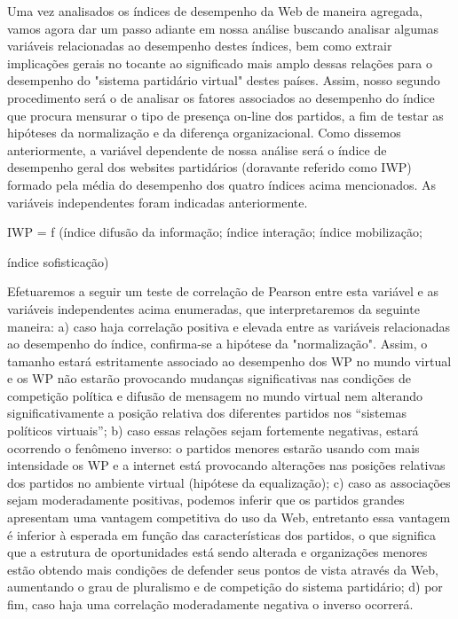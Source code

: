Uma vez analisados os índices de desempenho da Web de maneira agregada,
vamos agora dar um passo adiante em nossa análise buscando analisar
algumas variáveis relacionadas ao desempenho destes índices, bem como
extrair implicações gerais no tocante ao significado mais amplo dessas
relações para o desempenho do "sistema partidário virtual" destes
países. Assim, nosso segundo procedimento será o de analisar os fatores
associados ao desempenho do índice que procura mensurar o tipo de
presença on-line dos partidos, a fim de testar as hipóteses da
normalização e da diferença organizacional. Como dissemos anteriormente,
a variável dependente de nossa análise será o índice de desempenho geral
dos websites partidários (doravante referido como IWP) formado pela
média do desempenho dos quatro índices acima mencionados. As variáveis
independentes foram indicadas anteriormente.

IWP = f (índice difusão da informação; índice interação; índice
mobilização;

índice sofisticação)

Efetuaremos a seguir um teste de correlação de Pearson entre esta
variável e as variáveis independentes acima enumeradas, que
interpretaremos da seguinte maneira: a) caso haja correlação positiva e
elevada entre as variáveis relacionadas ao desempenho do índice,
confirma-se a hipótese da "normalização". Assim, o tamanho estará
estritamente associado ao desempenho dos WP no mundo virtual e os WP não
estarão provocando mudanças significativas nas condições de competição
política e difusão de mensagem no mundo virtual nem alterando
significativamente a posição relativa dos diferentes partidos nos
``sistemas políticos virtuais''; b) caso essas relações sejam fortemente
negativas, estará ocorrendo o fenômeno inverso: o partidos menores
estarão usando com mais intensidade os WP e a internet está provocando
alterações nas posições relativas dos partidos no ambiente virtual
(hipótese da equalização); c) caso as associações sejam moderadamente
positivas, podemos inferir que os partidos grandes apresentam uma
vantagem competitiva do uso da Web, entretanto essa vantagem é inferior
à esperada em função das características dos partidos, o que significa
que a estrutura de oportunidades está sendo alterada e organizações
menores estão obtendo mais condições de defender seus pontos de vista
através da Web, aumentando o grau de pluralismo e de competição do
sistema partidário; d) por fim, caso haja uma correlação moderadamente
negativa o inverso ocorrerá.

